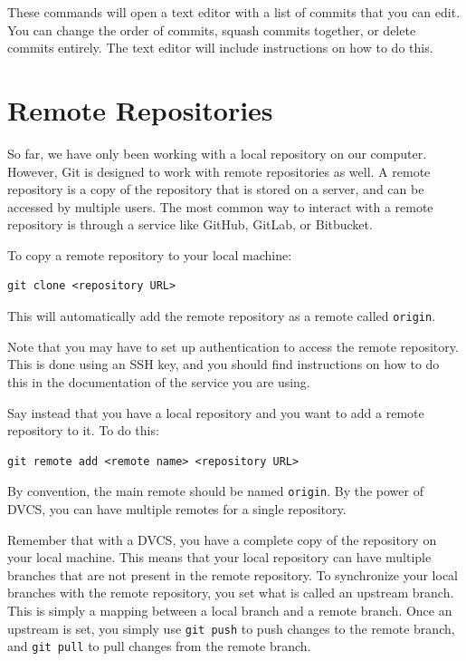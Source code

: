 \documentclass[fleqn]{article}
\begin{document}
These commands will open a text editor with a list of commits that you can
edit. You can change the order of commits, squash commits together, or delete
commits entirely. The text editor will include instructions on how to do this.

\pagebreak

\section*{Remote Repositories}

So far, we have only been working with a local repository on our computer.
However, Git is designed to work with remote repositories as well. A remote
repository is a copy of the repository that is stored on a server, and can be
accessed by multiple users. The most common way to interact with a remote
repository is through a service like GitHub, GitLab, or Bitbucket.

To copy a remote repository to your local machine:

\begin{lstlisting}
git clone <repository URL>
\end{lstlisting}

This will automatically add the remote repository as a remote called
\texttt{origin}.

Note that you may have to set up authentication to access the remote repository.
This is done using an SSH key, and you should find instructions on how to do
this in the documentation of the service you are using.

Say instead that you have a local repository and you want to add a remote
repository to it. To do this:

\begin{lstlisting}
git remote add <remote name> <repository URL>
\end{lstlisting}

By convention, the main remote should be named \texttt{origin}. By the power of
DVCS, you can have multiple remotes for a single repository.

Remember that with a DVCS, you have a complete copy of the repository on your
local machine. This means that your local repository can have multiple branches
that are not present in the remote repository. To synchronize your local
branches with the remote repository, you set what is called an upstream branch.
This is simply a mapping between a local branch and a remote branch. Once an
upstream is set, you simply use \texttt{git push} to push changes to the remote
branch, and \texttt{git pull} to pull changes from the remote branch.
\end{document}
